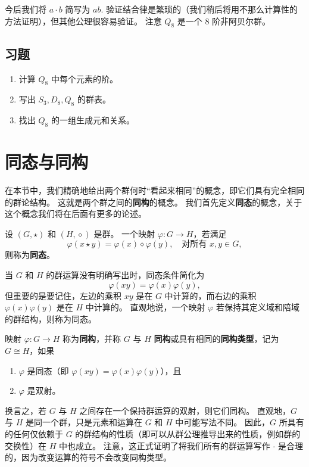 今后我们将 \( a \cdot b \) 简写为 \( ab \). 
验证结合律是繁琐的（我们稍后将用不那么计算性的方法证明），但其他公理很容易验证。
注意 \( Q_8 \) 是一个 8 阶非阿贝尔群。

\subsection*{习题}

\begin{enumerate}
\item 计算 \(Q_8\) 中每个元素的阶。
\item 写出 \(S_3, D_8, Q_8\) 的群表。
\item 找出 \(Q_8\) 的一组生成元和关系。
\end{enumerate}

\section{同态与同构}

在本节中，我们精确地给出两个群何时“看起来相同”的概念，即它们具有完全相同的群论结构。
这就是两个群之间的\textbf{同构}的概念。
我们首先定义\textbf{同态}的概念，关于这个概念我们将在后面有更多的论述。

\begin{definition}
设 \((G, \star)\) 和 \((H, \diamond)\) 是群。
一个映射 \(\varphi : G \to H\)，若满足
\[
\varphi(x \star y) = \varphi(x) \diamond \varphi(y), \quad \text{对所有 } x, y \in G,
\]
则称为\textbf{同态}。
\end{definition}

当 \( G \) 和 \( H \) 的群运算没有明确写出时，同态条件简化为
\[
\varphi(xy) = \varphi(x)\varphi(y),
\]
但重要的是要记住，左边的乘积 \( xy \) 是在 \( G \) 中计算的，而右边的乘积 \( \varphi(x)\varphi(y) \) 是在 \( H \) 中计算的。
直观地说，一个映射 \( \varphi \) 若保持其定义域和陪域的群结构，则称为同态。

\begin{definition}
映射 \( \varphi : G \to H \) 称为\textbf{同构}，并称 \( G \) 与 \( H \) \textbf{同构}或具有相同的\textbf{同构类型}，记为 \( G \cong H \)，如果
\begin{enumerate}[label=(\arabic*)]
\item \( \varphi \) 是同态（即 \( \varphi(xy) = \varphi(x)\varphi(y) \)），且
\item \( \varphi \) 是双射。
\end{enumerate}
换言之，若 \( G \) 与 \( H \) 之间存在一个保持群运算的双射，则它们同构。
直观地，\( G \) 与 \( H \) 是同一个群，只是元素和运算在 \( G \) 和 \( H \) 中可能写法不同。
因此，\( G \) 所具有的任何仅依赖于 \( G \) 的群结构的性质（即可以从群公理推导出来的性质，例如群的交换性）在 \( H \) 中也成立。
注意，这正式证明了将我们所有的群运算写作 \(\cdot\) 是合理的，因为改变运算的符号不会改变同构类型。
\end{definition}

